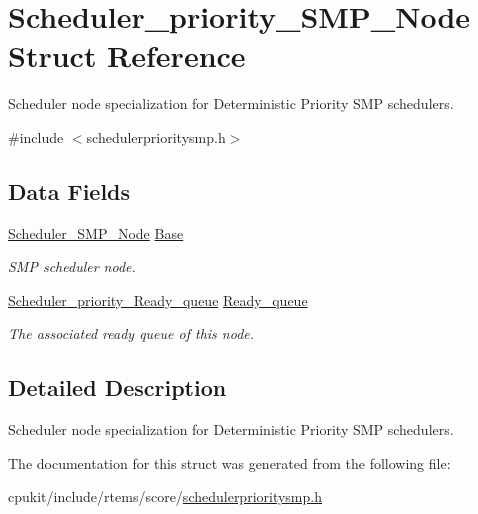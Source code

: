 \hypertarget{structScheduler__priority__SMP__Node}{}\section{Scheduler\+\_\+priority\+\_\+\+S\+M\+P\+\_\+\+Node Struct Reference}
\label{structScheduler__priority__SMP__Node}


Scheduler node specialization for Deterministic Priority S\+MP schedulers.  




{\ttfamily \#include $<$schedulerprioritysmp.\+h$>$}

\subsection*{Data Fields}
\begin{DoxyCompactItemize}
\item 
\mbox{\label{structScheduler__priority__SMP__Node_ab598ef15d50aed8dc00be751f4c9f5de}} 
\mbox{\hyperlink{structScheduler__SMP__Node}{Scheduler\+\_\+\+S\+M\+P\+\_\+\+Node}} \mbox{\hyperlink{structScheduler__priority__SMP__Node_ab598ef15d50aed8dc00be751f4c9f5de}{Base}}
\begin{DoxyCompactList}\small\item\em S\+MP scheduler node. \end{DoxyCompactList}\item 
\mbox{\label{structScheduler__priority__SMP__Node_a22ab89b5686b12bfe01033dbecf470a2}} 
\mbox{\hyperlink{structScheduler__priority__Ready__queue}{Scheduler\+\_\+priority\+\_\+\+Ready\+\_\+queue}} \mbox{\hyperlink{structScheduler__priority__SMP__Node_a22ab89b5686b12bfe01033dbecf470a2}{Ready\+\_\+queue}}
\begin{DoxyCompactList}\small\item\em The associated ready queue of this node. \end{DoxyCompactList}\end{DoxyCompactItemize}


\subsection{Detailed Description}
Scheduler node specialization for Deterministic Priority S\+MP schedulers. 

The documentation for this struct was generated from the following file\+:\begin{DoxyCompactItemize}
\item 
cpukit/include/rtems/score/\mbox{\hyperlink{schedulerprioritysmp_8h}{schedulerprioritysmp.\+h}}\end{DoxyCompactItemize}
